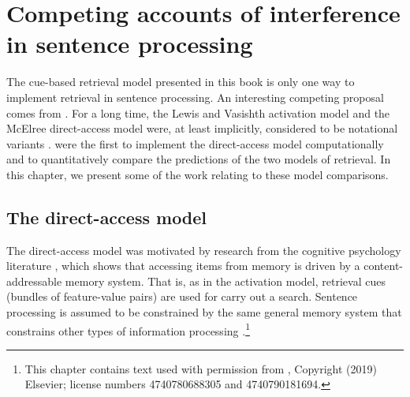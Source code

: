\documentclass{cambridge7A}\usepackage[]{graphicx}\usepackage[]{color}
\begin{document}

\chapter{Competing accounts of interference in sentence processing} \label{c05}

The cue-based retrieval model presented in this book is only one way to implement retrieval in sentence processing. An interesting competing proposal comes from \cite{McElree2000,McElree2006}. For a long time, the Lewis and Vasishth activation model and the McElree direct-access model were, at least implicitly, considered to be notational variants \citep[e.g., see][]{LewisVasishthVanDyke2006,parkervandykeshvartsman2017}. \cite{NicenboimRetrieval2018} were the first to implement the direct-access model computationally and  to quantitatively compare the predictions of the two models of retrieval. In this chapter, we present some of the work relating to these model comparisons.

\section{The direct-access model}

The direct-access model was motivated by research from the cognitive psychology literature \citep{McElree2000,VanDyke2006,McElree2006}, which shows that accessing items from memory is driven by a content-addressable memory system. That is, as in the activation model,  retrieval cues (bundles of feature-value pairs) are used for carry out a search.  Sentence processing is assumed to be constrained by the same general memory system that constrains other types of information processing \citep{McElree1993}.\footnote{This chapter contains text used with permission from \cite{VasishthEtAlTiCS2019}, Copyright (2019) Elsevier; license numbers 4740780688305 and 4740790181694.} 
\end{document}
